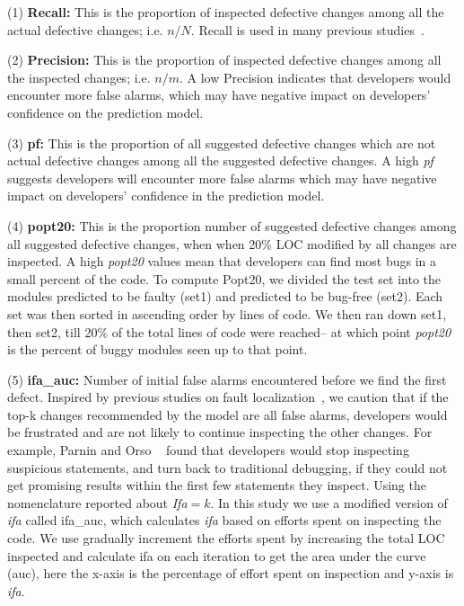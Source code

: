 \documentclass[10pt,journal,compsoc]{IEEEtran}
\begin{document}
(1) \textbf{Recall:} This is the proportion of inspected defective changes among all the actual defective changes; i.e. $n/N$.
Recall is used in  many previous studies~\cite{kamei2012large,yang2016effort,yang2017tlel,xia2016collective,yang2015deep}.  

(2) \textbf{Precision:} This is the proportion of inspected defective changes among all the inspected changes; i.e. $n/m$. A low Precision indicates that developers would encounter more false alarms, which may have negative impact on developers' confidence on the prediction model.  

(3) \textbf{pf:} This is the proportion of all suggested defective changes which are not actual defective changes among all the suggested defective changes. A high {\em pf} suggests developers will encounter more false alarms which may have negative impact on developers' confidence in the prediction model.

(4) \textbf{popt20:} This is the proportion number of suggested defective changes among all suggested defective changes, when when 20\% LOC modified by all changes are inspected. 
A high {\em popt20} values mean that developers can find most bugs in a small percent of the code.
To compute Popt20, we divided the test set into the modules predicted to be faulty (set1)
and predicted to be bug-free (set2). Each set was then sorted in ascending order by lines 
of code.  We then ran down set1, then set2, till 20\% of the total lines of code
were reached-- at which point {\em popt20} is the percent of buggy modules seen up to that point.

(5) \textbf{ifa\_auc:} Number of  initial false alarms encountered before we find the first defect. Inspired by previous studies on fault localization~\cite{parnin2011automated,kochhar2016practitioners,xia2016automated}, we caution that if the top-k changes recommended by the model are all false alarms, developers would be frustrated and are not likely to continue inspecting the other changes. For example, Parnin and Orso ~\cite{parnin2011automated} found that developers would stop inspecting suspicious statements, and turn back to traditional debugging, if they could not get promising results within the first few statements they inspect. Using the nomenclature reported
about {\em Ifa$=k$}.  In this study we use a modified version of {\em ifa} called ifa\_auc, which calculates {\em ifa} based on efforts spent on inspecting the code. We use gradually increment the efforts spent by increasing the total LOC inspected and calculate ifa on each iteration to get the area under the curve (auc), here the x-axis is the percentage of effort spent on inspection and y-axis is {\em ifa}.
\end{document}
